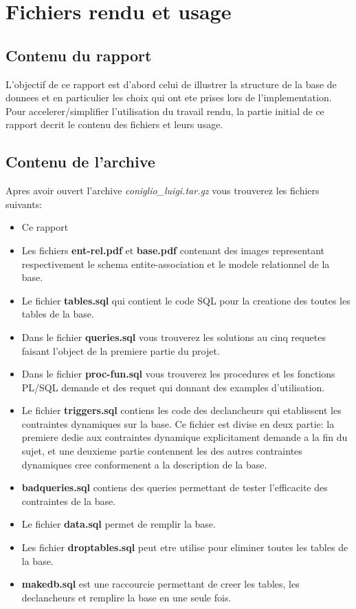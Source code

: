 \documentclass[twoside,openright,a4paper,11pt,french]{article}
\begin{document}
\pagestyle{plain}
\setlength{\parindent}{0pt}



\parskip=0pt
\tableofcontents

\newpage


\section{Fichiers rendu et usage}
\subsection{Contenu du rapport}
L'objectif de ce rapport est d'abord celui de illustrer la structure de la base
de donnees et en particulier les choix qui ont ete prises lors de
l'implementation. Pour accelerer/simplifier l'utilisation du travail rendu, la
partie initial de ce rapport decrit le contenu des fichiers et leurs usage.

\subsection{Contenu de l'archive}
Apres avoir ouvert l'archive {\it coniglio\_luigi.tar.gz} vous
trouverez les fichiers suivants:
\smallbreak
\begin{itemize}
\item Ce rapport
\item Les fichiers {\bf ent-rel.pdf} et {\bf base.pdf} contenant
      des images representant respectivement le schema entite-association
      et le modele relationnel de la base.
\item Le fichier {\bf tables.sql} qui contient le code SQL pour la
      creatione des toutes les tables de la base.
\item Dans le fichier {\bf queries.sql} vous trouverez les solutions
      au cinq requetes faisant l'object de la premiere partie du projet.
\item Dans le fichier {\bf proc-fun.sql} vous trouverez les procedures
      et les fonctions PL/SQL demande et des requet qui donnant des 
      examples d'utilisation.
\item Le fichier {\bf triggers.sql} contiens les code des declancheurs qui
      etablissent les contraintes dynamiques sur la base.  Ce fichier est divise en
      deux partie: la premiere dedie aux contraintes dynamique explicitament
      demande a la fin du sujet, et une deuxieme partie contennent les
      des autres contraintes dynamiques cree conformenent a la description de la
      base.
\item {\bf badqueries.sql} contiens des queries permettant de tester l'efficacite 
      des contraintes de la base.
\item Le fichier {\bf data.sql} permet de remplir la base.
\item Les fichier {\bf droptables.sql} peut etre utilise pour eliminer toutes 
      les tables de la base.
\item {\bf makedb.sql} est une raccourcie permettant de creer les tables, les
      declancheurs et remplire la base en une seule fois.
\end{itemize}
\end{document}
